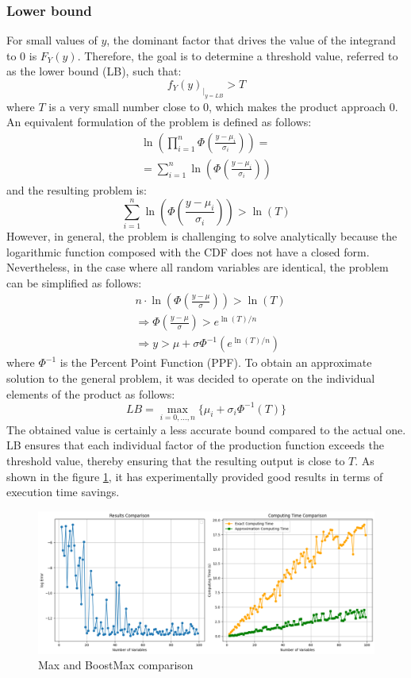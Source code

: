 \subsubsection{Lower bound}
For small values of \( y \), the dominant factor that drives the value of the integrand to 0 is \( F_Y(y) \). Therefore, the goal is to determine a threshold value, referred to as the lower bound (LB), such that:
$$f_Y(y)_{|_{y = LB}} > T $$
where \( T \) is a very small number close to 0, which makes the product approach 0. An equivalent formulation of the problem is defined as follows:
\begin{align*}
    \ln{\left(\prod_{i = 1}^n \Phi\left(\frac{y - \mu_i}{\sigma_i}\right)\right)} = \\
    = \sum_{i=1}^n  \ln{\left(\Phi\left(\frac{y - \mu_i}{\sigma_i}\right)\right)}
\end{align*}
and the resulting problem is:
$$ \sum_{i=1}^n  \ln{\left(\Phi\left(\frac{y - \mu_i}{\sigma_i}\right)\right)} > \ln(T) $$
However, in general, the problem is challenging to solve analytically because the logarithmic function composed with the CDF does not have a closed form. Nevertheless, in the case where all random variables are identical, the problem can be simplified as follows:
\begin{align*}
    &n \cdot \ln{\left(\Phi\left(\frac{y - \mu}{\sigma}\right)\right)} > \ln(T) \\
    & \Rightarrow \Phi\left(\frac{y - \mu}{\sigma}\right) > e^{\ln(T) / n} \\
    & \Rightarrow y > \mu + \sigma \Phi^{-1}\left(e^{\ln(T) / n}\right)
\end{align*}
where $\Phi^{-1}$ is the Percent Point Function (PPF). To obtain an approximate solution to the general problem, it was decided to operate on the individual elements of the product as follows:
$$LB = \max_{i=0,...,n}\{\mu_i + \sigma_i \Phi^{-1}(T)\}$$
The obtained value is certainly a less accurate bound compared to the actual one.
LB ensures that each individual factor of the production function exceeds the threshold value, thereby ensuring that the resulting output is close to $T$.
As shown in the figure \ref{plot}, it has experimentally provided good results in terms of execution time savings.

\begin{figure}[h!]
	\centering
	\includegraphics[width=\textwidth]{../../code/notebooks/images/comparison.png} %
		\caption{Max and BoostMax comparison}
			\label{plot}
\end{figure}


